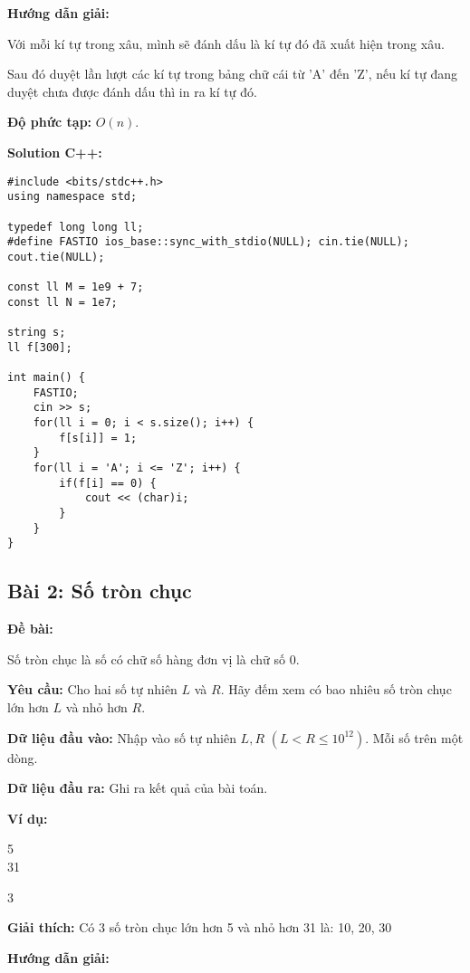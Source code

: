 \documentclass[12pt]{scrartcl}  %
\begin{document}
\textbf{Hướng dẫn giải:}

Với mỗi kí tự trong xâu, mình sẽ đánh dấu là kí tự đó đã xuất hiện trong xâu.

Sau đó duyệt lần lượt các kí tự trong bảng chữ cái từ 'A' đến 'Z', nếu kí tự đang duyệt chưa được đánh dấu
thì in ra kí tự đó.

\textbf{Độ phức tạp:} $O(n)$.

\textbf{Solution C++:}
\begin{lstlisting}
#include <bits/stdc++.h>
using namespace std;

typedef long long ll;
#define FASTIO ios_base::sync_with_stdio(NULL); cin.tie(NULL); cout.tie(NULL);

const ll M = 1e9 + 7;
const ll N = 1e7;

string s;
ll f[300];

int main() {
    FASTIO;
    cin >> s;
    for(ll i = 0; i < s.size(); i++) {
        f[s[i]] = 1; 
    }
    for(ll i = 'A'; i <= 'Z'; i++) {
        if(f[i] == 0) {
            cout << (char)i;
        }
    }
}

\end{lstlisting}

\subsection{Bài 2: Số tròn chục}
\textbf{Đề bài:}

Số tròn chục là số có chữ số hàng đơn vị là chữ số $0$.

\textbf{Yêu cầu:}
Cho hai số tự nhiên $L$ và $R$. Hãy đếm xem có bao nhiêu số tròn chục lớn hơn $L$ và nhỏ hơn $R$.

\textbf{Dữ liệu đầu vào:}
Nhập vào số tự nhiên $L, R$ $(L < R \leq 10^{12})$. Mỗi số trên một dòng.

\textbf{Dữ liệu đầu ra:}
Ghi ra kết quả của bài toán.

\textbf{Ví dụ:}
\begin{tcolorbox}[colback=gray!5!white, colframe=blue!50!black, title=Input]
5\\
31
\end{tcolorbox}
\begin{tcolorbox}[colback=gray!5!white, colframe=green!50!black, title=Output]
3
\end{tcolorbox}

\textbf{Giải thích:}
Có 3 số tròn chục lớn hơn 5 và
nhỏ hơn 31 là: 10, 20, 30

\textbf{Hướng dẫn giải:}
\end{document}
